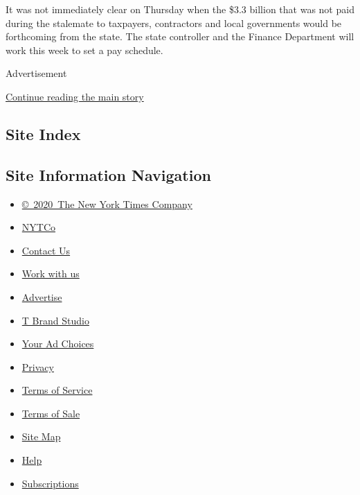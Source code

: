 It was not immediately clear on Thursday when the \$3.3 billion that was
not paid during the stalemate to taxpayers, contractors and local
governments would be forthcoming from the state. The state controller
and the Finance Department will work this week to set a pay schedule.

Advertisement

\protect\hyperlink{after-bottom}{Continue reading the main story}

\hypertarget{site-index}{%
\subsection{Site Index}\label{site-index}}

\hypertarget{site-information-navigation}{%
\subsection{Site Information
Navigation}\label{site-information-navigation}}

\begin{itemize}
\tightlist
\item
  \href{https://help.nytimes3xbfgragh.onion/hc/en-us/articles/115014792127-Copyright-notice}{©~2020~The
  New York Times Company}
\end{itemize}

\begin{itemize}
\tightlist
\item
  \href{https://www.nytco.com/}{NYTCo}
\item
  \href{https://help.nytimes3xbfgragh.onion/hc/en-us/articles/115015385887-Contact-Us}{Contact
  Us}
\item
  \href{https://www.nytco.com/careers/}{Work with us}
\item
  \href{https://nytmediakit.com/}{Advertise}
\item
  \href{http://www.tbrandstudio.com/}{T Brand Studio}
\item
  \href{https://www.nytimes3xbfgragh.onion/privacy/cookie-policy\#how-do-i-manage-trackers}{Your
  Ad Choices}
\item
  \href{https://www.nytimes3xbfgragh.onion/privacy}{Privacy}
\item
  \href{https://help.nytimes3xbfgragh.onion/hc/en-us/articles/115014893428-Terms-of-service}{Terms
  of Service}
\item
  \href{https://help.nytimes3xbfgragh.onion/hc/en-us/articles/115014893968-Terms-of-sale}{Terms
  of Sale}
\item
  \href{https://spiderbites.nytimes3xbfgragh.onion}{Site Map}
\item
  \href{https://help.nytimes3xbfgragh.onion/hc/en-us}{Help}
\item
  \href{https://www.nytimes3xbfgragh.onion/subscription?campaignId=37WXW}{Subscriptions}
\end{itemize}
